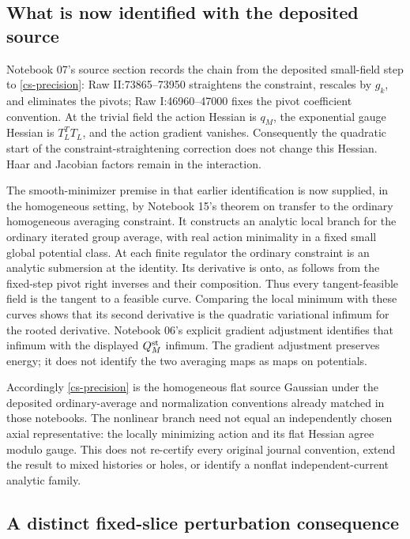\documentclass[11pt]{article}
\theoremstyle{remark}
\begin{document}
\subsection{What is now identified with the deposited source}

Notebook 07's source section records the chain from the deposited
small-field step to \eqref{cs-precision}: Raw II:73865--73950
straightens the constraint, rescales by $g_k$, and eliminates the
pivots; Raw I:46960--47000 fixes the pivot coefficient convention.
At the trivial field the action Hessian is $q_M$, the exponential
gauge Hessian is $T_L^TT_L$, and the action gradient vanishes.
Consequently the quadratic start of the constraint-straightening
correction does not change this Hessian. Haar and Jacobian factors
remain in the interaction.

The smooth-minimizer premise in that earlier identification is now
supplied, in the homogeneous setting, by Notebook 15's theorem on
transfer to the ordinary homogeneous averaging constraint. It
constructs an analytic local branch for the ordinary iterated group
average, with real action minimality in a fixed small global
potential class. At each finite regulator the ordinary constraint
is an analytic submersion at the identity. Its derivative is onto,
as follows from the fixed-step pivot right inverses and their
composition. Thus every tangent-feasible field is the tangent to
a feasible curve. Comparing the local minimum with these curves
shows that its second derivative is the quadratic variational
infimum for the rooted derivative. Notebook 06's explicit
gradient adjustment identifies that infimum with the displayed
$Q_M^{\rm st}$ infimum. The gradient adjustment preserves energy;
it does not identify the two averaging maps as maps on potentials.

Accordingly \eqref{cs-precision} is the homogeneous flat source
Gaussian under the deposited ordinary-average and normalization
conventions already matched in those notebooks. The nonlinear
branch need not equal an independently chosen axial representative:
the locally minimizing action and its flat Hessian agree modulo
gauge. This does not re-certify every original journal convention,
extend the result to mixed histories or holes, or identify a
nonflat independent-current analytic family.

\subsection{A distinct fixed-slice perturbation consequence}
\end{document}

